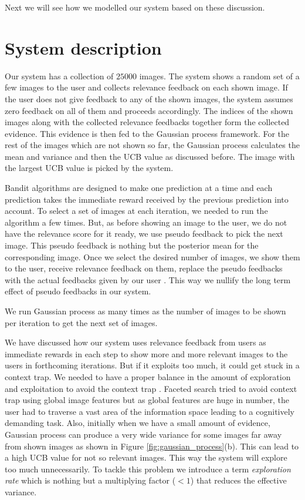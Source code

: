 \documentclass[english]{tktltiki}
\begin{document}
Next we will see how we modelled our system based on these discussion.



\section{System description}

Our system has a collection of $25000$ images. The system \cite{re_qlir} shows a random set of a few images to the user and collects relevance feedback on each shown image. If the user does not give feedback to any of the shown images, the system assumes zero feedback on all of them and proceeds accordingly. The indices of the shown images along with the collected relevance feedbacks together form the collected evidence. This evidence is then fed to the Gaussian process framework. For the rest of the images which are not shown so far, the Gaussian process calculates the mean and variance and then the UCB value as discussed before. The image with the largest UCB value is picked by the system.

Bandit algorithms are designed to make one prediction at a time and each prediction takes the immediate reward received by the previous prediction into account. To select a set of images at each iteration, we needed to run the algorithm a few times. But, as before showing an image to the user, we do not have the relevance score for it ready, we use pseudo feedback to pick the next image. This pseudo feedback is nothing but the posterior mean for the corresponding image. Once we select the desired number of images, we show them to the user, receive relevance feedback on them, replace the pseudo feedbacks with the actual feedbacks given by our user \cite{imse}. This way we nullify the long term effect of pseudo feedbacks in our system.

We run Gaussian process as many times as the number of images to be shown per iteration to get the next set of images.

We have discussed how our system uses relevance feedback from users as immediate rewards in each step to show more and more relevant images to the users in forthcoming iterations. But if it exploits too much, it could get stuck in a context trap. We needed to have a proper balance in the amount of exploration and exploitation to avoid the context trap \cite{dir_expl_search, cbir_multinomial_rel_feed, iter_rel_feed}. Faceted search \cite{faceted_search_1, faceted_search_2} tried to avoid context trap using global image features but as global features are huge in number, the user had to traverse a vast area of the information space \cite{info_space} leading to a cognitively demanding task. Also, initially when we have a small amount of evidence, Gaussian process can produce a very wide variance for some images far away from shown images as shown in Figure \ref{fig:gaussian_process}(b). This can lead to a high UCB value for not so relevant images. This way the system will explore too much unnecessarily. To tackle this problem we introduce a term \textit{exploration rate} which is nothing but a multiplying factor ($<1$) that reduces the effective variance.
\end{document}
